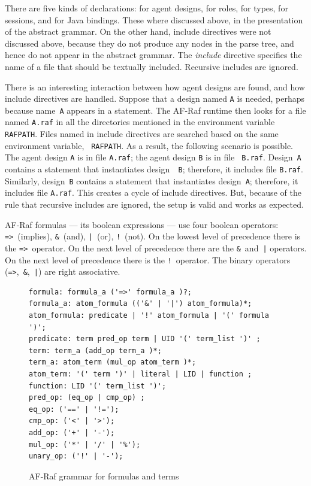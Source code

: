 \documentclass[a4paper,12pt,oneside,fleqn]{book} %
\begin{document}
{There are five kinds of declarations: for agent designs, for roles, for
types, for sessions, and for Java bindings. These where discussed above, in
the presentation of the abstract grammar. On the other hand, include
directives were not discussed above, because they do not produce any nodes
in the parse tree, and hence do not appear in the abstract grammar.  The
{\it include} directive specifies the name of a file that should be
textually included. Recursive includes are ignored.

There is an interesting interaction between how agent designs are found,
and how include directives are handled. Suppose that a design named {\tt A}
is needed, perhaps because name~{\tt A} appears in a statement. The AF-Raf
runtime then looks for a file named {\tt A.raf} in all the directories
mentioned in the environment variable {\tt RAFPATH}. Files named in include
directives are searched based on the same environment variable, {\tt
RAFPATH}. As a result, the following scenario is possible. The agent design
{\tt A} is in file {\tt A.raf}; the agent design {\tt B} is in file {\tt
B.raf}. Design~{\tt A} contains a statement that instantiates design~{\tt
B}; therefore, it includes file {\tt B.raf}. Similarly, design~{\tt B}
contains a statement that instantiates design~{\tt A}; therefore, it
includes file {\tt A.raf}. This creates a cycle of include directives.
But, because of the rule that recursive includes are ignored, the setup is
valid and works as expected.

AF-Raf formulas --- its boolean expressions --- use four boolean operators:
\verb+=>+~(implies), \verb+&+~(and), \verb+|+~(or), \verb+!+~(not).  On the
lowest level of precedence there is the \verb+=>+~operator.  On the next
level of precedence there are the \verb+&+~and~\verb+|+ operators. On the
next level of precedence there is the \verb+!+~operator.  The binary
operators (\verb+=>+,~\verb+&+,~\verb+|+) are right associative.

\begin{figure}\footnotesize %
\begin{verbatim}
formula: formula_a ('=>' formula_a )?;
formula_a: atom_formula (('&' | '|') atom_formula)*;
atom_formula: predicate | '!' atom_formula | '(' formula ')';
predicate: term pred_op term | UID '(' term_list ')' ;
term: term_a (add_op term_a )*;
term_a: atom_term (mul_op atom_term )*;
atom_term: '(' term ')' | literal | LID | function ;
function: LID '(' term_list ')';
pred_op: (eq_op | cmp_op) ;
eq_op: ('==' | '!=');
cmp_op: ('<' | '>');
add_op: ('+' | '-');
mul_op: ('*' | '/' | '%');
unary_op: ('!' | '-');
\end{verbatim}
\caption{AF-Raf grammar for formulas and terms}
\label{fig:grammar-expr}
\end{figure} %

}
\end{document}
